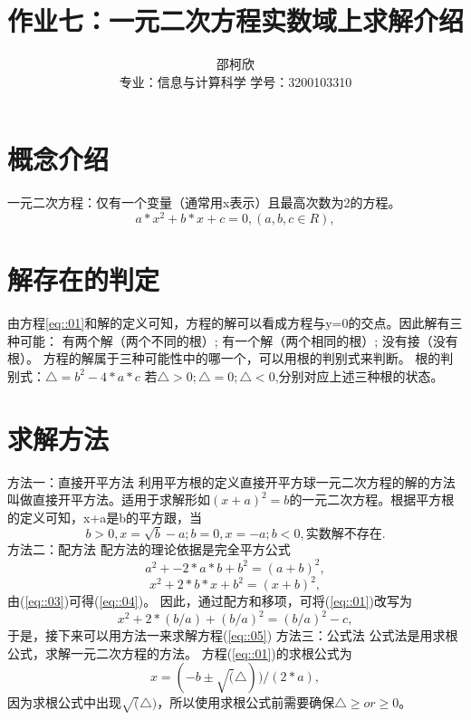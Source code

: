\documentclass{ctexart}
\title{作业七：一元二次方程实数域上求解介绍}
\author{邵柯欣 \\专业：信息与计算科学  学号：3200103310}
\begin{document}
\maketitle

\section{概念介绍}
一元二次方程：仅有一个变量（通常用x表示）且最高次数为2的方程。
\begin{equation}
  a*x^2+b*x+c=0,(a,b,c\in R),\label{eq::01}
\end{equation}

\section{解存在的判定}
由方程\ref{eq::01}和解的定义可知，方程的解可以看成方程与y=0的交点。因此解有三种可能：
有两个解（两个不同的根）;
有一个解（两个相同的根）;
没有接（没有根）。
方程的解属于三种可能性中的哪一个，可以用根的判别式来判断。
根的判别式：$\triangle=b^2-4*a*c$
若$\triangle > 0;\triangle = 0;\triangle < 0$,分别对应上述三种根的状态。

\section{求解方法}
方法一：直接开平方法
利用平方根的定义直接开平方球一元二次方程的解的方法叫做直接开平方法。适用于求解形如$(x+a)^2=b$的一元二次方程。根据平方根的定义可知，x+a是b的平方跟，当
\begin{equation}
b>0,x=\sqrt{b}-a;
b=0,x=-a;
b<0,实数解不存在.\label{eq::02}
\end{equation}
方法二：配方法
配方法的理论依据是完全平方公式
\begin{equation}
  a^2+-2*a*b+b^2=(a+b)^2,\label{eq::03}
\end{equation}
\begin{equation}
  x^2+2*b*x+b^2=(x+b)^2,\label{eq::04}
\end{equation}
由(\ref{eq::03})可得(\ref{eq::04})。
因此，通过配方和移项，可将(\ref{eq::01})改写为
\begin{equation}
  x^2+2*(b/a)+(b/a)^2=(b/a)^2-c,\label{eq::05}
\end{equation}
于是，接下来可以用方法一来求解方程(\ref{eq::05})
方法三：公式法
公式法是用求根公式，求解一元二次方程的方法。
方程(\ref{eq::01})的求根公式为
\begin{equation}
  x=(-b \pm \sqrt(\triangle))/(2*a),\label{eq::06}
\end{equation}
因为求根公式中出现$\sqrt(\triangle)$，所以使用求根公式前需要确保$\triangle \geq or \ge 0$。
\end{document}
